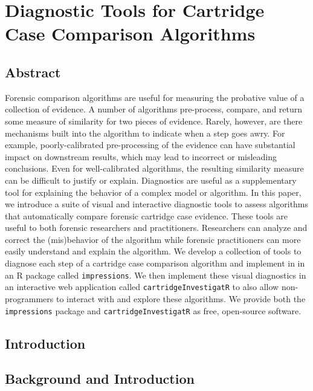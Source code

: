 \documentclass[11pt,]{isuthesis}
\begin{document}
\hypertarget{diagnostic-tools-for-cartridge-case-comparison-algorithms}{%
\chapter{Diagnostic Tools for Cartridge Case Comparison Algorithms}\label{diagnostic-tools-for-cartridge-case-comparison-algorithms}}

\hypertarget{abstract-1}{%
\section*{Abstract}\label{abstract-1}}

Forensic comparison algorithms are useful for measuring the probative value of a collection of evidence.
A number of algorithms pre-process, compare, and return some measure of similarity for two pieces of evidence.
Rarely, however, are there mechanisms built into the algorithm to indicate when a step goes awry.
For example, poorly-calibrated pre-processing of the evidence can have substantial impact on downstream results, which may lead to incorrect or misleading conclusions.
Even for well-calibrated algorithms, the resulting similarity measure can be difficult to justify or explain.
Diagnostics are useful as a supplementary tool for explaining the behavior of a complex model or algorithm.
In this paper, we introduce a suite of visual and interactive diagnostic tools to assess algorithms that automatically compare forensic cartridge case evidence.
These tools are useful to both forensic researchers and practitioners.
Researchers can analyze and correct the (mis)behavior of the algorithm while forensic practitioners can more easily understand and explain the algorithm.
We develop a collection of tools to diagnose each step of a cartridge case comparison algorithm and implement in in an R package called \texttt{impressions}.
We then implement these visual diagnostics in an interactive web application called \texttt{cartridgeInvestigatR} to also allow non-programmers to interact with and explore these algorithms.
We provide both the \texttt{impressions} package and \texttt{cartridgeInvestigatR} as free, open-source software.

\hypertarget{introduction}{%
\section{Introduction}\label{introduction}}

\hypertarget{background-and-introduction}{%
\section{Background and Introduction}\label{background-and-introduction}}
\end{document}
